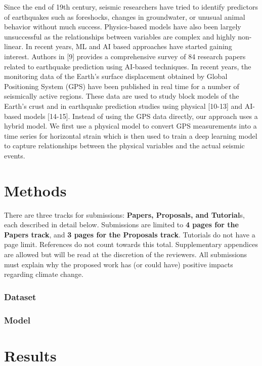 \documentclass{article}
\begin{document}
Since the end of 19th century, seismic researchers have tried to identify predictors of earthquakes such as foreshocks, changes in groundwater, or unusual animal behavior without much success. Physics-based models have also been largely unsuccessful as the relationships between variables are complex and highly non-linear. In recent years, ML and AI based approaches have started gaining interest. Authors in [9] provides a comprehensive survey of 84 research papers related to earthquake prediction using AI-based techniques. In recent years, the monitoring data of the Earth’s surface displacement obtained by Global Positioning System (GPS) have been published in real time for a number of seismically active regions. These data are used to study block models of the Earth’s crust and in earthquake prediction studies using physical [10-13] and AI-based models [14-15]. Instead of using the GPS data directly, our approach uses a hybrid model. We first use a physical model to convert GPS measurements into a time series for horizontal strain which is then used to train a deep learning model to capture relationships between the physical variables and the actual seismic events. 

\section{Methods}

There are three tracks for submissions: \textbf{Papers, Proposals, and Tutorial}s, each described in detail below.  Submissions are limited to \textbf{4 pages for the Papers track}, and \textbf{3 pages for the Proposals track}. Tutorials do not have a page limit. References do not count towards this total. Supplementary appendices are allowed but will be read at the discretion of the reviewers. All submissions must explain why the proposed work has (or could have) positive impacts regarding climate change.

\subsubsection{Dataset}

\subsubsection{Model}

\section{Results}
\end{document}
